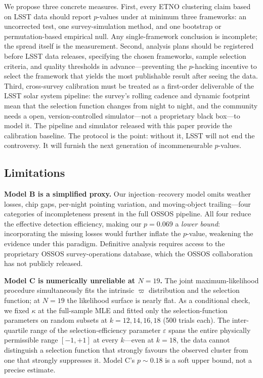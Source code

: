 \documentclass[12pt,a4paper]{article}
\begin{document}
We propose three concrete measures. First, every ETNO clustering claim based on LSST data should report $p$-values under at minimum three frameworks: an uncorrected test, one survey-simulation method, and one bootstrap or permutation-based empirical null. Any single-framework conclusion is incomplete; the spread itself is the measurement. Second, analysis plans should be registered before LSST data releases, specifying the chosen frameworks, sample selection criteria, and quality thresholds in advance---preventing the $p$-hacking incentive to select the framework that yields the most publishable result after seeing the data. Third, cross-survey calibration must be treated as a first-order deliverable of the LSST solar system pipeline: the survey's rolling cadence and dynamic footprint mean that the selection function changes from night to night, and the community needs a open, version-controlled simulator---not a proprietary black box---to model it. The pipeline and simulator released with this paper provide the calibration baseline. The protocol is the point: without it, LSST will not end the controversy. It will furnish the next generation of incommensurable $p$-values.

\subsection{Limitations}

\textbf{Model B is a simplified proxy.} Our injection--recovery model omits weather losses, chip gaps, per-night pointing variation, and moving-object trailing---four categories of incompleteness present in the full OSSOS pipeline. All four reduce the effective detection efficiency, making our $p=0.069$ a \textit{lower bound}: incorporating the missing losses would further inflate the $p$-value, weakening the evidence under this paradigm. Definitive analysis requires access to the proprietary OSSOS survey-operations database, which the OSSOS collaboration has not publicly released.

\textbf{Model C is numerically unreliable at $N=19$.} The joint maximum-likelihood procedure simultaneously fits the intrinsic $\varpi$ distribution and the selection function; at $N=19$ the likelihood surface is nearly flat. As a conditional check, we fixed $\kappa$ at the full-sample MLE and fitted only the selection-function parameters on random subsets at $k=12,14,16,18$ (500 trials each). The inter-quartile range of the selection-efficiency parameter $\varepsilon$ spans the entire physically permissible range $[-1,+1]$ at every $k$---even at $k=18$, the data cannot distinguish a selection function that strongly favours the observed cluster from one that strongly suppresses it. Model C's $p\sim0.18$ is a soft upper bound, not a precise estimate.
\end{document}
